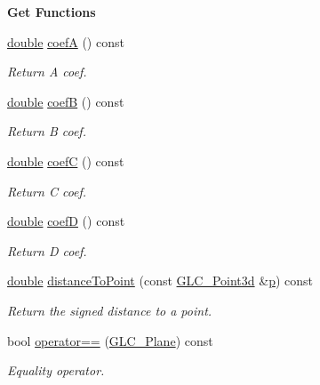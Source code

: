 \begin{Indent}{\bf Get Functions}\par
\begin{DoxyCompactItemize}
\item 
\hyperlink{_super_l_u_support_8h_a8956b2b9f49bf918deed98379d159ca7}{double} \hyperlink{class_g_l_c___plane_aae0081d9b3934d7dc5c43a2f6d3f96f1}{coef\-A} () const 
\begin{DoxyCompactList}\small\item\em Return A coef. \end{DoxyCompactList}\item 
\hyperlink{_super_l_u_support_8h_a8956b2b9f49bf918deed98379d159ca7}{double} \hyperlink{class_g_l_c___plane_a8d513c7fca596e32a1a550e375efebac}{coef\-B} () const 
\begin{DoxyCompactList}\small\item\em Return B coef. \end{DoxyCompactList}\item 
\hyperlink{_super_l_u_support_8h_a8956b2b9f49bf918deed98379d159ca7}{double} \hyperlink{class_g_l_c___plane_a5726e6c3dd678df18fcb1501a11c4c8c}{coef\-C} () const 
\begin{DoxyCompactList}\small\item\em Return C coef. \end{DoxyCompactList}\item 
\hyperlink{_super_l_u_support_8h_a8956b2b9f49bf918deed98379d159ca7}{double} \hyperlink{class_g_l_c___plane_a65302bffac03707d239a4bbe1050429f}{coef\-D} () const 
\begin{DoxyCompactList}\small\item\em Return D coef. \end{DoxyCompactList}\item 
\hyperlink{_super_l_u_support_8h_a8956b2b9f49bf918deed98379d159ca7}{double} \hyperlink{class_g_l_c___plane_ae32e0cdd2bd0e6f4b48be05c04825ccb}{distance\-To\-Point} (const \hyperlink{glc__vector3d_8h_a4e13a9bbc7ab3d34de7e98b41836772c}{G\-L\-C\-\_\-\-Point3d} \&\hyperlink{glext_8h_aa5367c14d90f462230c2611b81b41d23}{p}) const 
\begin{DoxyCompactList}\small\item\em Return the signed distance to a point. \end{DoxyCompactList}\item 
bool \hyperlink{class_g_l_c___plane_a11a6a0d80cb45e1118e3d68b16d22543}{operator==} (\hyperlink{class_g_l_c___plane}{G\-L\-C\-\_\-\-Plane}) const 
\begin{DoxyCompactList}\small\item\em Equality operator. \end{DoxyCompactList}\item 

\end{DoxyCompactItemize}
\end{Indent}
